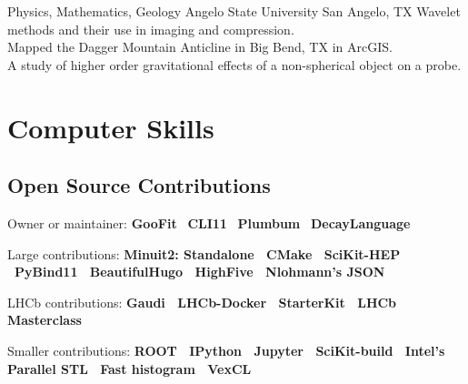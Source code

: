\documentclass[10pt,letterpaper,english]{moderncv}
\begin{document}
{Physics, Mathematics, Geology}
{Angelo State University}
{San Angelo, TX}
{}{Wavelet methods and their use in imaging and compression.\\
Mapped the Dagger Mountain Anticline in Big Bend, TX in ArcGIS.\\
A study of higher order gravitational effects of a non-spherical object on a probe.}








\section{Computer Skills}


\subsection{Open Source Contributions}



Owner or maintainer:
    \textbf {GooFit} \bullet\ 
    \textbf {CLI11} \bullet\ 
    \textbf {Plumbum} \bullet\
    \textbf {DecayLanguage}


Large contributions: \textbf{
   Minuit2: Standalone \bullet\
   CMake \bullet\  
   SciKit-HEP \bullet\  
   PyBind11 \bullet\ 
   BeautifulHugo \bullet\  
   HighFive  \bullet\  
   Nlohmann's JSON
}

LHCb contributions: \textbf{
	Gaudi \bullet\ 
	LHCb-Docker \bullet\ 
	StarterKit \bullet\ 
	LHCb Masterclass
}

Smaller contributions: \textbf{
	ROOT \bullet\ 
	IPython \bullet\ 
	Jupyter \bullet\ 
	SciKit-build \bullet\ 
	Intel’s Parallel STL \bullet\ 
	Fast histogram \bullet\  
	VexCL
}
\end{document}
